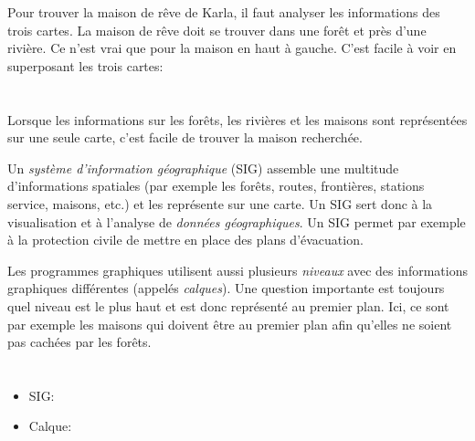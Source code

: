 {{{\centering%
\par}

Pour trouver la maison de rêve de Karla, il faut analyser les informations des trois cartes. La maison de rêve doit se trouver dans une forêt et près d’une rivière. Ce n’est vrai que pour la maison en haut à gauche. C’est facile à voir en superposant les trois cartes:

{\centering%
\par}



\section*{\BrochureItsInformatics}
Lorsque les informations sur les forêts, les rivières et les maisons sont représentées sur une seule carte, c’est facile de trouver la maison recherchée.

Un \emph{système d’information géographique} (SIG) assemble une multitude d’informations spatiales (par exemple les forêts, routes, frontières, stations service, maisons, etc.) et les représente sur une carte. Un SIG sert donc à la visualisation et à l’analyse de \emph{données géographiques}. Un SIG permet par exemple à la protection civile de mettre en place des plans d’évacuation.

Les programmes graphiques utilisent aussi plusieurs \emph{niveaux} avec des informations graphiques différentes (appelés \emph{calques}). Une question importante est toujours quel niveau est le plus haut et est donc représenté au premier plan. Ici, ce sont par exemple les maisons qui doivent être au premier plan afin qu’elles ne soient pas cachées par les forêts.



\section*{\BrochureWebsitesAndKeywords}
{\raggedright
\begin{itemize}
  \item SIG: \href{https://fr.wikipedia.org/wiki/Syst\%C3\%A8me_d\%27information_g\%C3\%A9ographique}{}
  \item Calque: \href{https://fr.wikipedia.org/wiki/Calque_(infographie)}{}
\end{itemize}


}}}

